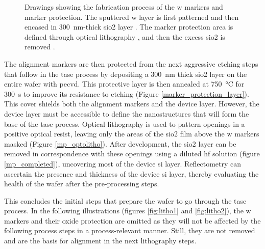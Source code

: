 \begin{figure}
{    }
    \caption[Drawings showing the fabrication process of the \acs{w} markers and marker protection.]{Drawings showing the fabrication process of the \acs{w} markers and marker protection. The sputtered \acs{w} layer  is first patterned  and then encased in \qty{300}{\nm}-thick \acs{sio2} layer . The marker protection area is defined through optical lithography , and then the excess \acs{sio2} is removed .}
    \label{fig:markers}
\end{figure}

\par
The alignment markers are then protected from the next aggressive etching steps that follow in the \acs{tase} process by depositing a \qty{300}{\nm} thick \acl{sio2} layer on the entire wafer with \acs{pecvd}. This protective layer is then annealed at \qty{750}{\degreeCelsius} for \qty{300}{s} to improve its resistance to etching (Figure \ref{marker_protection_layer}). This cover shields both the alignment markers and the device layer. However, the device layer must be accessible to define the nanostructures that will form the base of the \acs{tase} process. Optical lithography is used to pattern openings in a positive optical resist, leaving only the areas of the \acs{sio2} film above the \acl{w} markers masked (Figure \ref{mp_optolitho}). After development, the \acl{sio2} layer can be removed in correspondence with these openings using a diluted \acf{hf} solution (figure \ref{mp_completed}), uncovering most of the device \acs{si} layer. Reflectometry can ascertain the presence and thickness of the device \acs{si} layer, thereby evaluating the health of the wafer after the pre-processing steps.
\par
This concludes the initial steps that prepare the wafer to go through the \acs{tase} process. In the following illustrations (figures \ref{fig:litho1} and \ref{fig:litho2}), the \acl{w} markers and their oxide protection are omitted as they will not be affected by the following process steps in a process-relevant manner. Still, they are not removed and are the basis for alignment in the next lithography steps.


